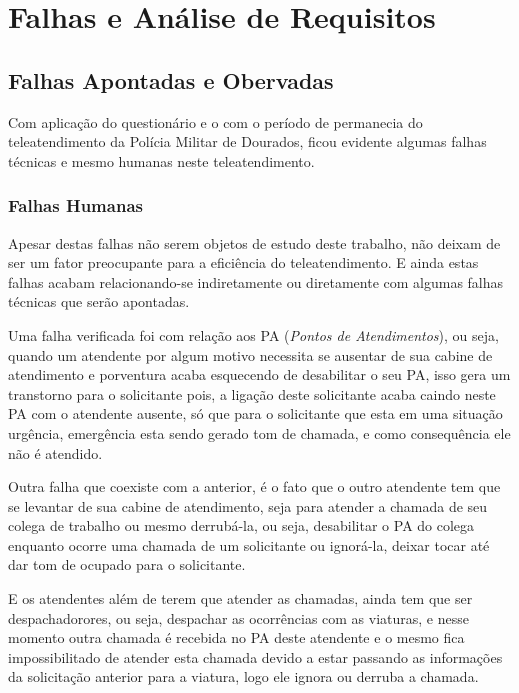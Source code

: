 
\chapter{Falhas e Análise de Requisitos} %
\section{Falhas Apontadas e Obervadas}
Com aplicação do questionário e o com o período de permanecia do teleatendimento da Polícia Militar de Dourados, ficou evidente algumas falhas técnicas e mesmo humanas neste teleatendimento.

\subsection{Falhas Humanas}
Apesar destas falhas não serem objetos de estudo deste trabalho, não deixam de ser um fator preocupante para a eficiência do teleatendimento. E ainda estas falhas acabam relacionando-se indiretamente ou diretamente com algumas falhas técnicas que serão apontadas.

Uma falha verificada foi com relação aos PA (\textit{Pontos de Atendimentos}), ou seja, quando um atendente por algum motivo necessita se ausentar de sua cabine de atendimento e porventura acaba esquecendo de desabilitar o seu PA, isso gera um transtorno para o solicitante pois, a ligação deste solicitante acaba caindo neste PA com o atendente ausente, só que para o solicitante que esta em uma situação urgência, emergência esta sendo gerado tom de chamada, e como consequência ele não é atendido.

Outra falha que coexiste com a anterior, é o fato que o outro atendente tem que se levantar de sua cabine de atendimento, seja para atender a chamada de seu colega de trabalho ou mesmo derrubá-la, ou seja, desabilitar o PA do colega enquanto ocorre uma chamada de um solicitante ou ignorá-la, deixar tocar até dar tom de ocupado para o solicitante.

E os atendentes além de terem que atender as chamadas, ainda tem que ser despachadorores, ou seja, despachar as ocorrências com as viaturas, e nesse momento outra chamada é recebida no PA deste atendente e o mesmo fica impossibilitado de atender esta chamada devido a estar passando as informações da solicitação anterior para a viatura, logo ele ignora ou derruba a chamada.

